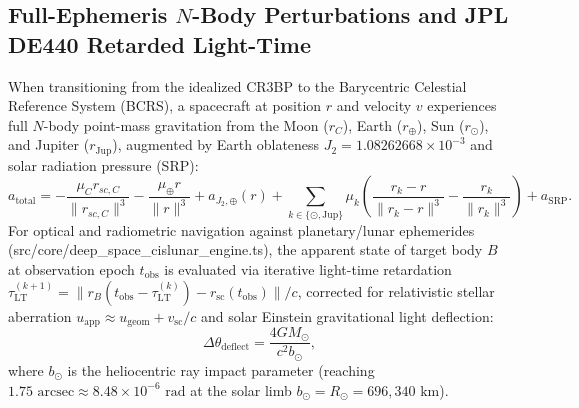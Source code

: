\documentclass[11pt,a4paper,reqno]{article}
\def\bm#1{#1}%
\def\texttt#1{#1}%
\def\mathbb#1{#1}%
\theoremstyle{plain}
\theoremstyle{definition}
\theoremstyle{remark}
\numberwithin{equation}{section}
\begin{document}
\subsection{Full-Ephemeris \texorpdfstring{$N$}{N}-Body Perturbations and JPL DE440 Retarded Light-Time}
When transitioning from the idealized CR3BP to the Barycentric Celestial Reference System (BCRS), a spacecraft at position $\bm{r}$ and velocity $\bm{v}$ experiences full $N$-body point-mass gravitation from the Moon ($\bm{r}_{\mathbb{C}}$), Earth ($\bm{r}_\oplus$), Sun ($\bm{r}_\odot$), and Jupiter ($\bm{r}_{\text{Jup}}$), augmented by Earth oblateness $J_2 = 1.08262668 \times 10^{-3}$ and solar radiation pressure (SRP):
\begin{equation}
  \bm{a}_{\text{total}} = -\frac{\mu_{\mathbb{C}} \bm{r}_{sc,\mathbb{C}}}{\|\bm{r}_{sc,\mathbb{C}}\|^3} - \frac{\mu_\oplus \bm{r}}{\|\bm{r}\|^3} + \bm{a}_{J_2,\oplus}(\bm{r}) + \sum_{k \in \{\odot, \text{Jup}\}} \mu_k \left( \frac{\bm{r}_k - \bm{r}}{\|\bm{r}_k - \bm{r}\|^3} - \frac{\bm{r}_k}{\|\bm{r}_k\|^3} \right) + \bm{a}_{\text{SRP}}.
  \label{eq:nrho_full_accel}
\end{equation}
For optical and radiometric navigation against planetary/lunar ephemerides (\texttt{src/core/deep\_space\_cislunar\_engine.ts}), the apparent state of target body $B$ at observation epoch $t_{\text{obs}}$ is evaluated via iterative light-time retardation $\tau_{\text{LT}}^{(k+1)} = \|\bm{r}_B(t_{\text{obs}} - \tau_{\text{LT}}^{(k)}) - \bm{r}_{\text{sc}}(t_{\text{obs}})\| / c$, corrected for relativistic stellar aberration $\bm{u}_{\text{app}} \approx \bm{u}_{\text{geom}} + \bm{v}_{\text{sc}}/c$ and solar Einstein gravitational light deflection:
\begin{equation}
  \Delta\theta_{\text{deflect}} = \frac{4 G M_\odot}{c^2 b_\odot},
  \label{eq:einstein_deflection}
\end{equation}
where $b_\odot$ is the heliocentric ray impact parameter (reaching $1.75\text{ arcsec} \approx 8.48 \times 10^{-6}\text{ rad}$ at the solar limb $b_\odot = R_\odot = 696,340\text{ km}$).
\end{document}
